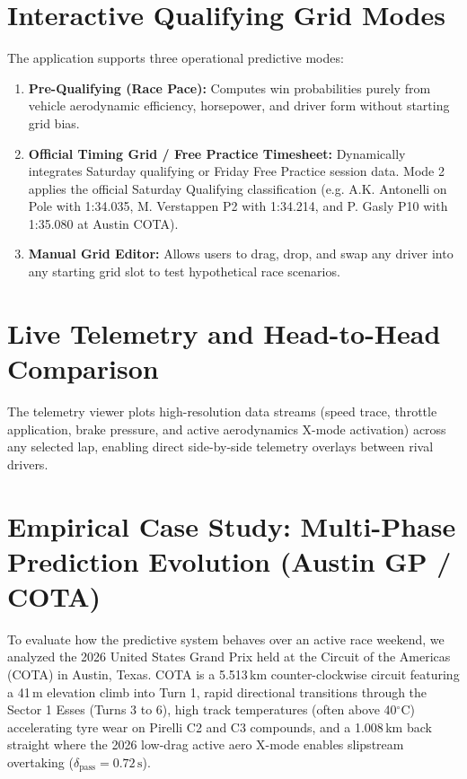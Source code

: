 \documentclass[12pt,a4paper]{report}
\begin{document}
\section{Interactive Qualifying Grid Modes}
The application supports three operational predictive modes:
\begin{enumerate}
    \item \textbf{Pre-Qualifying (Race Pace):} Computes win probabilities purely from vehicle aerodynamic efficiency, horsepower, and driver form without starting grid bias.
    \item \textbf{Official Timing Grid / Free Practice Timesheet:} Dynamically integrates Saturday qualifying or Friday Free Practice session data. Mode 2 applies the official Saturday Qualifying classification (e.g. A.K. Antonelli on Pole with 1:34.035, M. Verstappen P2 with 1:34.214, and P. Gasly P10 with 1:35.080 at Austin COTA).
    \item \textbf{Manual Grid Editor:} Allows users to drag, drop, and swap any driver into any starting grid slot to test hypothetical race scenarios.
\end{enumerate}

\section{Live Telemetry and Head-to-Head Comparison}
The telemetry viewer plots high-resolution data streams (speed trace, throttle application, brake pressure, and active aerodynamics X-mode activation) across any selected lap, enabling direct side-by-side telemetry overlays between rival drivers.

\section{Empirical Case Study: Multi-Phase Prediction Evolution (Austin GP / COTA)}
\label{sec:cota_case_study}
To evaluate how the predictive system behaves over an active race weekend, we analyzed the 2026 United States Grand Prix held at the Circuit of the Americas (COTA) in Austin, Texas. COTA is a 5.513\,km counter-clockwise circuit featuring a 41\,m elevation climb into Turn 1, rapid directional transitions through the Sector 1 Esses (Turns 3 to 6), high track temperatures (often above 40$^\circ$C) accelerating tyre wear on Pirelli C2 and C3 compounds, and a 1.008\,km back straight where the 2026 low-drag active aero X-mode enables slipstream overtaking ($\delta_{\text{pass}} = 0.72\,\text{s}$).
\end{document}
